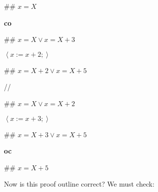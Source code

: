 \documentclass[muchmore,11pt]{article}%
\begin{document}
\begin{code}
\#\# $x=X$

\textbf{co}

\begin{indent}
\item \#\# $x=X\vee x=X+3$

\item $\left\langle x:=x+2;\right\rangle $

\item \#\# $x=X+2\vee x=X+5$
\end{indent}

//

\begin{indent}
\item \#\# $x=X\vee x=X+2$

\item $\left\langle x:=x+3;\right\rangle $

\item \#\# $x=X+3\vee x=X+5$
\end{indent}

\textbf{oc}

\#\# $x=X+5$
\end{code}

Now is this proof outline correct? We must check:
\end{document}
